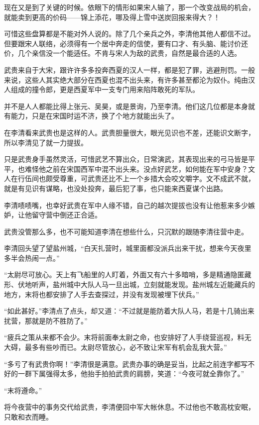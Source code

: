 现在又是到了关键的时候。依眼下的情形如果宋人输了，那一个改变战局的机会，就能卖到更高的价码——锦上添花，哪及得上雪中送炭回报来得大？！

可惜这些盘算都是不能对外人说的。除了几个亲兵之外，李清他其他人都信不过。但要跟宋人联络，必须得有一个居中奔走的信使，要有口才、有头脑、能讨价还价，几个亲信没一个能适任。不肯与宋人为敌的武贵，自然是最合适的人选。

武贵来自于大宋，跟许许多多投奔西夏的汉人一样，都是犯了罪，逃避刑罚。一般来说，这些人其实绝大部分在西夏也混不出头来，有许多甚至都沦为奴仆。纯由汉人组成的撞令郎，更是西夏军中一支专门用来陷阵敢死的军队。

并不是人人都能比得上张元、吴昊，或是景询，乃至李清。他们这几位都是本身就有能力，只是在宋国时运不济，换了个地方就能出头了。

在李清看来武贵也是这样的人。武贵胆量很大，眼光见识也不差，还能识文断字，所以李清见了就一力提拔。

只是武贵身手虽然灵活，可惜武艺不算出众，日常演武，其表现出来的弓马皆是平平，也难怪他之前在宋国西军中混不出头来。没点好武艺，如何能在军中安身？文人在行伍间也颇受尊重，可武贵还比不上一个乡措大会咬文嚼字。文不成武不就，就是有见识有谋略，也没处投奔，最后犯了事，也只能来西夏谋个出路。

李清啧啧嘴，也幸好武贵在军中人缘不错，自己的越次提拔也没有让他惹来多少嫉妒，让他留守营中倒还正合适。

武贵没管那么多，也不可能知道李清在想些什么，只沉默的跟随李清往营中走。

李清回头望了望盐州城，“白天扎营时，城里面都没派兵出来干扰，想来今天夜里多半会热闹一点。”

“太尉尽可放心。天上有飞船里的人盯着，外面又有六十多暗哨，多是精通隐匿藏形、伏地听声，盐州城中大队人马一旦出城，立刻就能发现。盐州城左近能藏兵的地方，末将也都安排了人手去查探过，并没有发现被埋下伏兵。”

“如此甚好。”李清点了点头，却又道：“不过就是能防着大队人马，若是十几骑出来扰营，那就是防不胜防了。”

“疲兵之策从来都不会少。末将前面奉太尉之命，也安排好了人手绕营巡视，料无大碍，最多有些吵而已。太尉尽管放心，必不致让宋军有机会乱我大营。”

“多亏了有武贵你啊！”李清很是满意。武贵办事的确是妥当，比起之前连字都写不好的一群下属强得太多，他抬手拍拍武贵的肩膀，笑道：“今夜可就全靠你了。”

“末将遵命。”

将今夜营中的事务交代给武贵，李清便回中军大帐休息。不过他也不敢高枕安眠，只敢和衣而睡。

